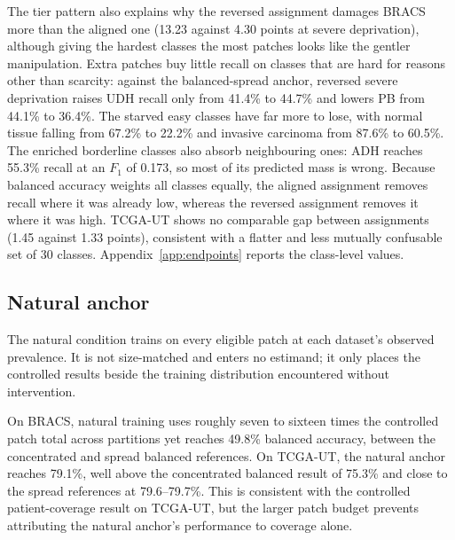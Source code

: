 \documentclass[11pt]{article}
\newcommand{\resultstable}[1]{}
\begin{document}
The tier pattern also explains why the reversed assignment damages BRACS more than the aligned one (\num{13.23} against \num{4.30} points at severe deprivation), although giving the hardest classes the most patches looks like the gentler manipulation. Extra patches buy little recall on classes that are hard for reasons other than scarcity: against the balanced-spread anchor, reversed severe deprivation raises UDH recall only from \num{41.4}\% to \num{44.7}\% and lowers PB from \num{44.1}\% to \num{36.4}\%. The starved easy classes have far more to lose, with normal tissue falling from \num{67.2}\% to \num{22.2}\% and invasive carcinoma from \num{87.6}\% to \num{60.5}\%. The enriched borderline classes also absorb neighbouring ones: ADH reaches \num{55.3}\% recall at an $F_1$ of \num{0.173}, so most of its predicted mass is wrong. Because balanced accuracy weights all classes equally, the aligned assignment removes recall where it was already low, whereas the reversed assignment removes it where it was high. TCGA-UT shows no comparable gap between assignments (\num{1.45} against \num{1.33} points), consistent with a flatter and less mutually confusable set of 30 classes. Appendix~\ref{app:endpoints} reports the class-level values.

\subsection{Natural anchor}
\label{sec:rq1-routing}
The natural condition trains on every eligible patch at each dataset's observed prevalence. It is not size-matched and enters no estimand; it only places the controlled results beside the training distribution encountered without intervention.

\begin{table}[H]
  \centering
  \footnotesize
  \resultstable{natural_anchor_summary}
  \caption{Natural and balanced cross-entropy anchors.}
  \label{tab:natural-anchor}
\end{table}

\noindent On BRACS, natural training uses roughly seven to sixteen times the controlled patch total across partitions yet reaches \num{49.8}\% balanced accuracy, between the concentrated and spread balanced references. On TCGA-UT, the natural anchor reaches \num{79.1}\%, well above the concentrated balanced result of \num{75.3}\% and close to the spread references at \num{79.6}--\num{79.7}\%. This is consistent with the controlled patient-coverage result on TCGA-UT, but the larger patch budget prevents attributing the natural anchor's performance to coverage alone.
\end{document}
